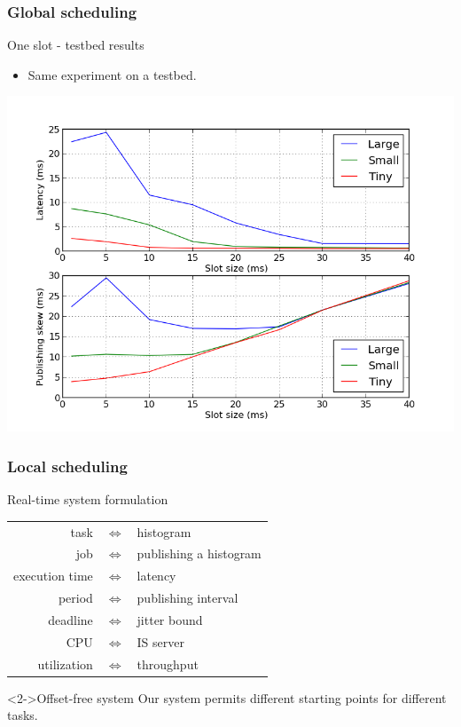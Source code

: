 \documentclass[]{prezentare}
\begin{document}
\begin{frame}
	\frametitle{Global scheduling}
	\begin{block}{One slot - testbed results}

	\begin{itemize}
	\item Same experiment on a testbed.
	\end{itemize}

	\vspace{-5mm}

	\begin{center}
	\includegraphics[scale=0.4]{../Images/one_slot_tbed}
	\end{center}
	\end{block}
\end{frame}
\begin{frame}
	\frametitle{Local scheduling}
	\begin{block}{Real-time system formulation}
	\begin{center}
	\begin{tabular}{r c l}
		task           & $\Longleftrightarrow$ & histogram \\
		job            & $\Longleftrightarrow$ & publishing a histogram \\
		execution time & $\Longleftrightarrow$ & latency \\
		period         & $\Longleftrightarrow$ & publishing interval \\	
		deadline       & $\Longleftrightarrow$ & jitter bound \\	
		CPU            & $\Longleftrightarrow$ & IS server \\
		utilization    & $\Longleftrightarrow$ & throughput \\
	\end{tabular}	
	\end{center}
	\end{block}

	\begin{block}<2->{Offset-free system}
	Our system permits different starting points for different tasks.
	\end{block}
\end{frame}
\end{document}
